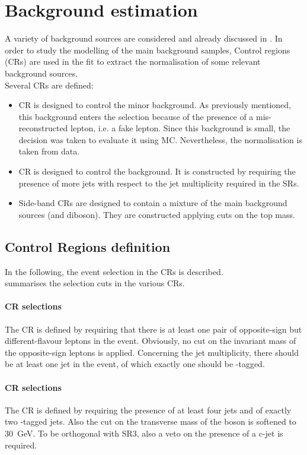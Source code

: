 \clearpage
\section{Background estimation}
\label{sec:background}
A variety of background sources are considered and already discussed in .
In order to study the modelling of the main background samples, Control regions (CRs) are used in the fit to extract the normalisation of some relevant background sources.\\
Several CRs are defined:
\begin{itemize}
	\item \ttbar CR is designed to control the minor \ttbar
	background. As previously mentioned, this background enters the
	selection because of the presence of a mis-reconstructed lepton,
	i.e. a fake lepton. Since this background is small, the decision was
	taken to evaluate it using MC. Nevertheless, the normalisation is
	taken from data. 
	\item \ttZ CR is designed to control the \ttZ
	background. It is constructed by requiring the presence of more jets
	with respect to the jet multiplicity required in the SRs.
	\item Side-band CRs are designed to contain a mixture
	of the main background sources (\ttZ and diboson). They are
	constructed applying cuts on the top mass.
\end{itemize}

\subsection {Control Regions definition}
\label{sec:bkg:sel}
In the following, the event selection in the CRs is described.\\
 summarises the selection cuts in the various CRs.
\paragraph{\ttbar CR selections}
The \ttbar CR is defined by requiring that there is at least one pair
of opposite-sign but different-flavour leptons in the
event. Obviously, no cut on the invariant mass of the opposite-sign
leptons is applied. Concerning the jet multiplicity, there should be
at least one jet in the event, of which exactly one should be
\Pqb-tagged.

\paragraph{\ttZ CR selections}
\label{sec:bkg:ttz}
The \ttZ CR is defined by requiring the presence of at least four jets
and of exactly two \Pqb-tagged jets. Also the cut on the transverse
mass of the \PW boson is softened to \SI{30}{\GeV}. To be orthogonal 
with SR3, also a veto on the presence of a c-jet is required. 

